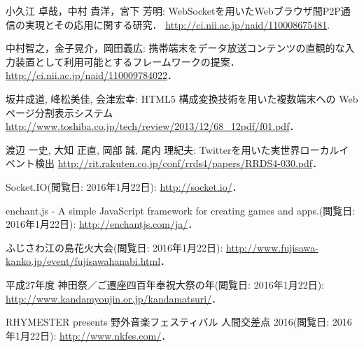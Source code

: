 \begin{thebibliography}{1}
        小久江 卓哉，中村 貴洋，宮下 芳明:
        WebSocketを用いたWebブラウザ間P2P通信の実現とその応用に関する研究．
        \url{http://ci.nii.ac.jp/naid/110008675481}.

        中村智之，金子晃介，岡田義広:
        携帯端末をデータ放送コンテンツの直観的な入力装置として利用可能とするフレームワークの提案．
        \url{http://ci.nii.ac.jp/naid/110009784022}．

        坂井成道, 峰松美佳, 会津宏幸:
        HTML5 構成変換技術を用いた複数端末への Web ページ分割表示システム
        \url{http://www.toshiba.co.jp/tech/review/2013/12/68_12pdf/f01.pdf}．

        渡辺 一史, 大知 正直, 岡部 誠, 尾内 理紀夫:
        Twitterを用いた実世界ローカルイベント検出
        \url{http://rit.rakuten.co.jp/conf/rrds4/papers/RRDS4-030.pdf}．

        Socket.IO(閲覧日: 2016年1月22日):
        \url{http://socket.io/}．

        enchant.js - A simple JavaScript framework for creating games and apps.(閲覧日: 2016年1月22日):
        \url{http://enchantjs.com/ja/}．

        ふじさわ江の島花火大会(閲覧日: 2016年1月22日):
        \url{http://www.fujisawa-kanko.jp/event/fujisawahanabi.html}．

        平成27年度 神田祭／ご遷座四百年奉祝大祭の年(閲覧日: 2016年1月22日):
        \url{http://www.kandamyoujin.or.jp/kandamatsuri/}．

        RHYMESTER presents 野外音楽フェスティバル 人間交差点 2016(閲覧日: 2016年1月22日):
        \url{http://www.nkfes.com/}．

\end{thebibliography}
